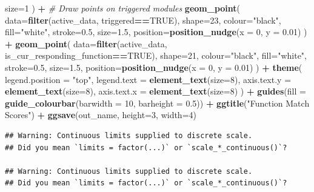 \documentclass[]{book}
\newenvironment{Shaded}{\begin{snugshade}}{\end{snugshade}}
\newcommand{\CommentTok}[1]{\textcolor[rgb]{0.56,0.35,0.01}{\textit{#1}}}
\newcommand{\DataTypeTok}[1]{\textcolor[rgb]{0.13,0.29,0.53}{#1}}
\newcommand{\DecValTok}[1]{\textcolor[rgb]{0.00,0.00,0.81}{#1}}
\newcommand{\FloatTok}[1]{\textcolor[rgb]{0.00,0.00,0.81}{#1}}
\newcommand{\KeywordTok}[1]{\textcolor[rgb]{0.13,0.29,0.53}{\textbf{#1}}}
\newcommand{\NormalTok}[1]{#1}
\newcommand{\OperatorTok}[1]{\textcolor[rgb]{0.81,0.36,0.00}{\textbf{#1}}}
\newcommand{\OtherTok}[1]{\textcolor[rgb]{0.56,0.35,0.01}{#1}}
\newcommand{\StringTok}[1]{\textcolor[rgb]{0.31,0.60,0.02}{#1}}
\begin{document}
\begin{Shaded}
\begin{Highlighting}[]
    \DataTypeTok{size=}\DecValTok{1}
\NormalTok{  ) }\OperatorTok{+}
\StringTok{  }\CommentTok{# Draw points on triggered modules}
\StringTok{  }\KeywordTok{geom_point}\NormalTok{(}
    \DataTypeTok{data=}\KeywordTok{filter}\NormalTok{(active_data, triggered}\OperatorTok{==}\OtherTok{TRUE}\NormalTok{),}
    \DataTypeTok{shape=}\DecValTok{23}\NormalTok{,}
    \DataTypeTok{colour=}\StringTok{"black"}\NormalTok{,}
    \DataTypeTok{fill=}\StringTok{"white"}\NormalTok{,}
    \DataTypeTok{stroke=}\FloatTok{0.5}\NormalTok{,}
    \DataTypeTok{size=}\FloatTok{1.5}\NormalTok{,}
    \DataTypeTok{position=}\KeywordTok{position_nudge}\NormalTok{(}\DataTypeTok{x =} \DecValTok{0}\NormalTok{, }\DataTypeTok{y =} \FloatTok{0.01}\NormalTok{)}
\NormalTok{  ) }\OperatorTok{+}
\StringTok{  }\KeywordTok{geom_point}\NormalTok{(}
    \DataTypeTok{data=}\KeywordTok{filter}\NormalTok{(active_data, is_cur_responding_function}\OperatorTok{==}\OtherTok{TRUE}\NormalTok{),}
    \DataTypeTok{shape=}\DecValTok{21}\NormalTok{,}
    \DataTypeTok{colour=}\StringTok{"black"}\NormalTok{,}
    \DataTypeTok{fill=}\StringTok{"white"}\NormalTok{,}
    \DataTypeTok{stroke=}\FloatTok{0.5}\NormalTok{,}
    \DataTypeTok{size=}\FloatTok{1.5}\NormalTok{,}
    \DataTypeTok{position=}\KeywordTok{position_nudge}\NormalTok{(}\DataTypeTok{x =} \DecValTok{0}\NormalTok{, }\DataTypeTok{y =} \FloatTok{0.01}\NormalTok{)}
\NormalTok{  ) }\OperatorTok{+}
\StringTok{  }\KeywordTok{theme}\NormalTok{(}
    \DataTypeTok{legend.position =} \StringTok{"top"}\NormalTok{,}
    \DataTypeTok{legend.text =} \KeywordTok{element_text}\NormalTok{(}\DataTypeTok{size=}\DecValTok{8}\NormalTok{),}
    \DataTypeTok{axis.text.y =} \KeywordTok{element_text}\NormalTok{(}\DataTypeTok{size=}\DecValTok{8}\NormalTok{),}
    \DataTypeTok{axis.text.x =} \KeywordTok{element_text}\NormalTok{(}\DataTypeTok{size=}\DecValTok{8}\NormalTok{)}
\NormalTok{  ) }\OperatorTok{+}
\StringTok{  }\KeywordTok{guides}\NormalTok{(}\DataTypeTok{fill =} \KeywordTok{guide_colourbar}\NormalTok{(}\DataTypeTok{barwidth =} \DecValTok{10}\NormalTok{, }\DataTypeTok{barheight =} \FloatTok{0.5}\NormalTok{)) }\OperatorTok{+}
\StringTok{  }\KeywordTok{ggtitle}\NormalTok{(}\StringTok{"Function Match Scores"}\NormalTok{) }\OperatorTok{+}
\StringTok{  }\KeywordTok{ggsave}\NormalTok{(out_name, }\DataTypeTok{height=}\DecValTok{3}\NormalTok{, }\DataTypeTok{width=}\DecValTok{4}\NormalTok{)}
\end{Highlighting}
\end{Shaded}

\begin{verbatim}
## Warning: Continuous limits supplied to discrete scale.
## Did you mean `limits = factor(...)` or `scale_*_continuous()`?

## Warning: Continuous limits supplied to discrete scale.
## Did you mean `limits = factor(...)` or `scale_*_continuous()`?
\end{verbatim}
\end{document}
